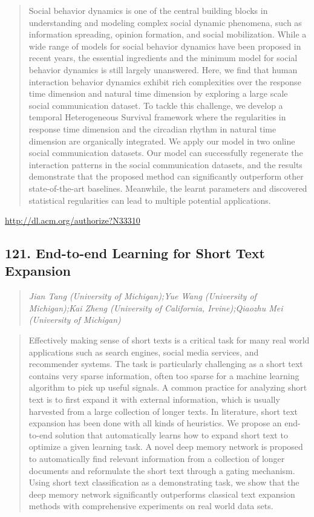 \documentclass{article}
\begin{document}
\begin{quote}
Social behavior dynamics is one of the central building blocks in understanding and modeling complex social dynamic phenomena, such as information spreading, opinion formation, and social mobilization. While a wide range of models for social behavior dynamics have been proposed in recent years, the essential ingredients and the minimum model for social behavior dynamics is still largely unanswered. Here, we find that human interaction behavior dynamics exhibit rich complexities over the response time dimension and natural time dimension by exploring a large scale social communication dataset. To tackle this challenge, we develop a temporal Heterogeneous Survival framework where the regularities in response time dimension and the circadian rhythm in natural time dimension are organically integrated. We apply our model in two online social communication datasets. Our model can successfully regenerate the interaction patterns in the social communication datasets, and the results demonstrate that the proposed method can significantly outperform other state-of-the-art baselines. Meanwhile, the learnt parameters and discovered statistical regularities can lead to multiple potential applications.
\end{quote}

\href{http://dl.acm.org/authorize?N33310}{http://dl.acm.org/authorize?N33310}

\subsection{121. End-to-end Learning for Short Text Expansion}

\begin{quote}
\footnotesize{\textit{Jian Tang (University of Michigan);Yue Wang (University of Michigan);Kai Zheng (University of California, Irvine);Qiaozhu Mei (University of Michigan)}}

\end{quote}

\begin{quote}
Effectively making sense of short texts is a critical task for many real world applications such as search engines, social media services, and recommender systems. The task is particularly challenging as a short text contains very sparse information, often too sparse for a machine learning algorithm to pick up useful signals. A common practice for analyzing short text is to first expand it with external information, which is usually harvested from a large collection of longer texts. In literature, short text expansion has been done with all kinds of heuristics. We propose an end-to-end solution that automatically learns how to expand short text to optimize a given learning task. A novel deep memory network is proposed to automatically find relevant information from a collection of longer documents and reformulate the short text through a gating mechanism. Using short text classification as a demonstrating task, we show that the deep memory network significantly outperforms classical text expansion methods with comprehensive experiments on real world data sets.
\end{quote}
\end{document}
